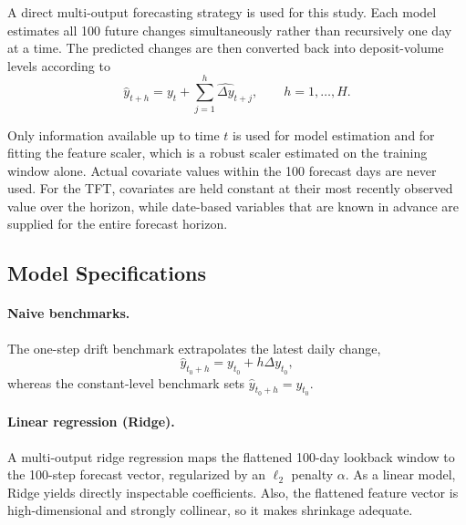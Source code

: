 \documentclass[11pt,a4paper]{article}
\begin{document}
A direct multi-output forecasting strategy is used for this study. Each model
estimates all 100 future changes simultaneously rather than recursively one
day at a time. The predicted changes are then converted back into
deposit-volume levels according to
\begin{equation}
    \widehat{y}_{t+h}
    =
    y_t+
    \sum_{j=1}^{h}
    \widehat{\Delta y}_{t+j},
    \qquad h=1,\ldots,H.
    \label{eq:level_reconstruction}
\end{equation}


\indent Only information available up to time $t$ is used for model estimation
and for fitting the feature scaler, which is a robust scaler estimated on the
training window alone. Actual covariate values within the 100 forecast days
are never used. For the TFT, covariates are held constant at their most
recently observed value over the horizon, while date-based variables that are
known in advance are supplied for the entire forecast horizon.

\subsection{Model Specifications}

\paragraph{Naive benchmarks.}
The one-step drift benchmark extrapolates the latest daily change,
\[
\hat{y}_{t_0+h}=y_{t_0}+h\Delta y_{t_0},
\]
whereas the constant-level benchmark sets
\(\hat{y}_{t_0+h}=y_{t_0}\).

\paragraph{Linear regression (Ridge).}
A multi-output ridge regression maps the flattened 100-day lookback window to
the 100-step forecast vector, regularized by an $\ell_2$ penalty $\alpha$. As a linear model, Ridge yields
directly inspectable coefficients. Also, the flattened feature vector is
high-dimensional and strongly collinear, so it makes shrinkage adequate.
\end{document}
